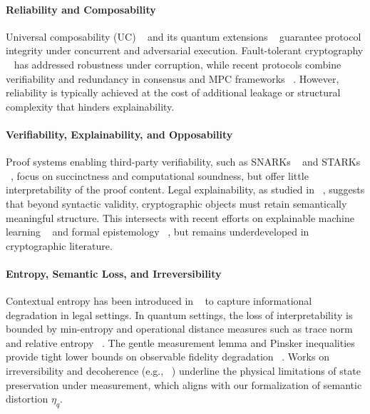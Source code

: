 \documentclass[preprint,12pt]{elsarticle}
\begin{document}
            \paragraph{Reliability and Composability}  
            Universal composability (UC) ~\cite{Canetti2001} and its quantum extensions ~\cite{Unruh2010} guarantee protocol integrity under concurrent and adversarial execution. Fault-tolerant cryptography ~\cite{BenOr2006, DworkNaor1992} has addressed robustness under corruption, while recent protocols combine verifiability and redundancy in consensus and MPC frameworks ~\cite{Cramer2015}. However, reliability is typically achieved at the cost of additional leakage or structural complexity that hinders explainability.

            \paragraph{Verifiability, Explainability, and Opposability}  
            Proof systems enabling third-party verifiability, such as SNARKs ~\cite{BenSasson2014} and STARKs ~\cite{BenSasson2018}, focus on succinctness and computational soundness, but offer little interpretability of the proof content. Legal explainability, as studied in ~\cite{Alam2023, Bertol2023}, suggests that beyond syntactic validity, cryptographic objects must retain semantically meaningful structure. This intersects with recent efforts on explainable machine learning ~\cite{DoshiVelez2017} and formal epistemology ~\cite{Williamson2000}, but remains underdeveloped in cryptographic literature.

            \paragraph{Entropy, Semantic Loss, and Irreversibility}  
            Contextual entropy has been introduced in ~\cite{Alam2023} to capture informational degradation in legal settings. In quantum settings, the loss of interpretability is bounded by min-entropy and operational distance measures such as trace norm and relative entropy ~\cite{Wilde2017}. The gentle measurement lemma and Pinsker inequalities provide tight lower bounds on observable fidelity degradation ~\cite{Wilming2018}. Works on irreversibility and decoherence (e.g., ~\cite{Berthiaume1997, Wigner1963}) underline the physical limitations of state preservation under measurement, which aligns with our formalization of semantic distortion $\eta_q$.
\end{document}
